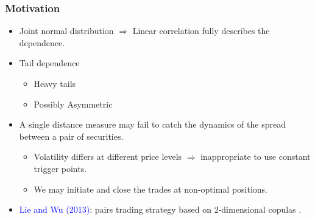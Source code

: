 \documentclass[pdf,10pt,xcolor=dvipsnames,hide notes]{beamer}
\begin{document}
	
	\begin{frame}[label=frame1c]
		\frametitle{Motivation}
		
		
		\begin{itemize}
			\justifying
			
			\item Joint normal distribution $\Rightarrow$ Linear correlation fully describes the dependence. 
			
			
			\pause
			
			\vspace{0.3cm}
			
			\item  Tail dependence
				\begin{itemize}
					\item Heavy tails
					\item Possibly Asymmetric
				\end{itemize}
			
					
			
	\vspace{0.3cm}
	
	\pause
			
		\item A single distance measure may fail to catch the dynamics of the spread between a pair of securities.
			\begin{itemize}
				\item Volatility differs at different price levels $\Rightarrow$ inappropriate to use constant trigger points.
				\item We may initiate and close the trades at non-optimal positions.
			\end{itemize}
		
		
	\pause	
			\vspace{0.3cm}
			
			\item \textcolor{blue}{Lie and Wu} \textcolor{blue}{(2013)}:  pairs trading strategy based on 2-dimensional copulas .
			
			\vspace{0.3cm}
			
		
		\end{itemize}
	\end{frame}
\end{document}
